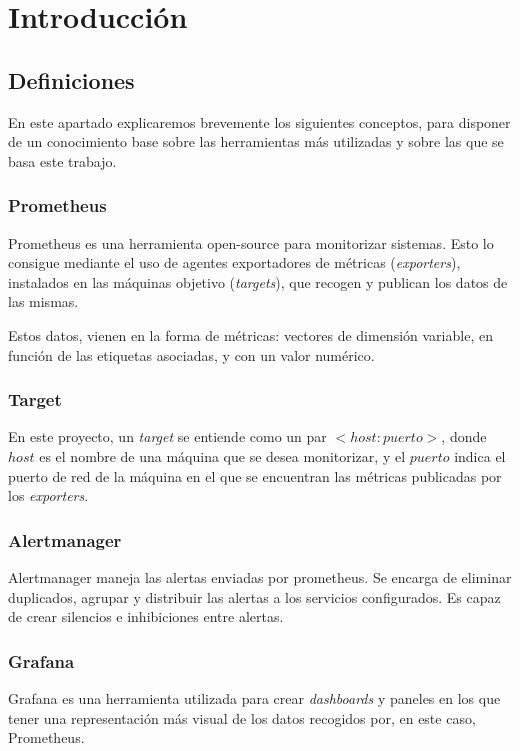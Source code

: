 \chapter{Introducción}
\label{ch:intro}

\section{Definiciones}
En este apartado explicaremos brevemente los siguientes conceptos, para disponer de un conocimiento base sobre las herramientas más utilizadas y sobre las que se basa este trabajo.

\subsection*{Prometheus}
Prometheus\cite{prometheus} es una herramienta open-source para monitorizar sistemas. Esto lo consigue mediante el uso de agentes exportadores de métricas (\textit{exporters}), instalados en las máquinas objetivo (\textit{targets}), que recogen y publican los datos de las mismas.

Estos datos, vienen en la forma de métricas: vectores de dimensión variable, en función de las etiquetas asociadas, y con un valor numérico.

\subsection*{Target}
En este proyecto, un \textit{target} se entiende como un par \textit{$<host:puerto>$}, donde \textit{$host$} es el nombre de una máquina que se desea monitorizar, y el $puerto$ indica el puerto de red de la máquina en el que se encuentran las métricas publicadas por los \textit{exporters}.

\subsection*{Alertmanager}
Alertmanager\cite{alertmanager} maneja las alertas enviadas por prometheus. Se encarga de eliminar duplicados, agrupar y distribuir las alertas a los servicios configurados. Es capaz de crear silencios e inhibiciones entre alertas.

\subsection*{Grafana}
Grafana\cite{grafana} es una herramienta utilizada para crear \textit{dashboards} y paneles en los que tener una representación más visual de los datos recogidos por, en este caso, Prometheus.

